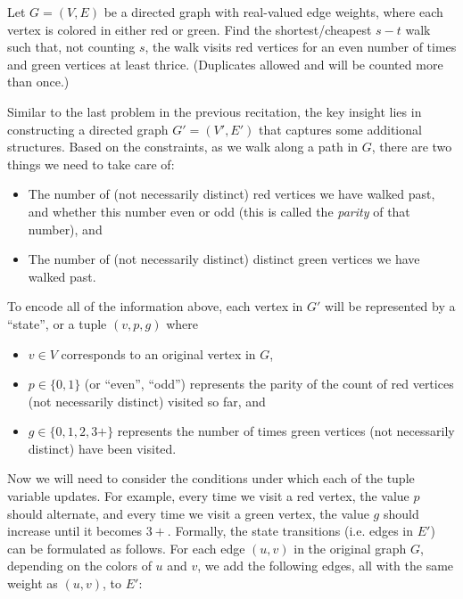   \begin{exercise}
    Let $G=(V,E)$ be a directed graph with real-valued edge weights, where each vertex is colored in either {\color{red} red} or {\color{dkgreen} green}. Find the shortest/cheapest $s-t$ walk such that, not counting $s$, the walk visits red vertices for an even number of times and green vertices at least thrice. (Duplicates allowed and will be counted more than once.)
  \end{exercise}
  \begin{solution}
    Similar to the last problem in the previous recitation, the key insight lies in constructing a directed graph $G'=(V', E')$ that captures some additional structures. Based on the constraints, as we walk along a path in $G$, there are two things we need to take care of: 
    \begin{itemize}
      \item The number of (not necessarily distinct) red vertices we have walked past, and whether this number even or odd (this is called the \textit{parity} of that number), and
      \item The number of (not necessarily distinct) distinct green vertices we have walked past. 
    \end{itemize}
    To encode all of the information above, each vertex in $G'$ will be represented by a ``state'', or a tuple $(v, p, g)$ where
    \begin{itemize}
      \item $v\in V$ corresponds to an original vertex in $G$,
      \item $p\in \{0,1\}$ (or ``even'', ``odd'') represents the parity of the count of red vertices (not necessarily distinct) visited so far, and
      \item $g \in \{0,1,2,3+\}$ represents the number of times green vertices (not necessarily distinct) have been visited.
    \end{itemize}

    Now we will need to consider the conditions under which each of the tuple variable updates. For example, every time we visit a red vertex, the value $p$ should alternate, and every time we visit a green vertex, the value $g$ should increase until it becomes $3+$. Formally, the state transitions (i.e. edges in $E'$) can be formulated as follows. For each edge $(u,v)$ in the original graph $G$, depending on the colors of $u$ and $v$, we add the following edges, all with the same weight as $(u,v)$, to $E'$:


\end{solution}
